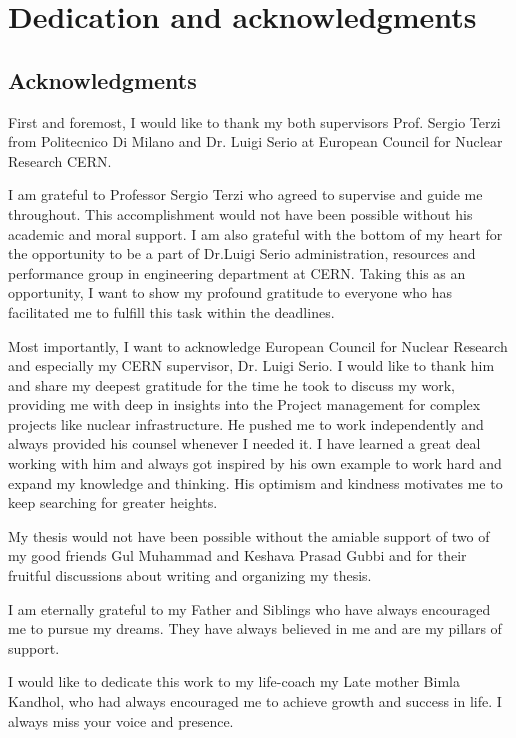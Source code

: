 %
%

\chapter*{Dedication and acknowledgments}
\begin{SingleSpace}
\section*{Acknowledgments}
First and foremost, I would like to thank my both supervisors Prof. Sergio Terzi from Politecnico Di Milano and Dr. Luigi Serio at European Council for Nuclear Research CERN. 

I am grateful to Professor Sergio Terzi who agreed to supervise and guide me throughout. This accomplishment would not have been possible without his academic and moral support. I am also grateful with the bottom of my heart for the opportunity to be a part of Dr.Luigi Serio administration, resources and performance group in engineering department at CERN. Taking this as an opportunity, I want to show my profound gratitude to everyone who has facilitated me to fulfill this task within the deadlines. 

Most importantly, I want to acknowledge European Council for Nuclear Research and especially my CERN supervisor, Dr. Luigi Serio.  I would like to thank him and share my deepest gratitude for the time he took to discuss my work, providing me with deep in insights into the Project management for complex projects like nuclear infrastructure. He pushed me to work independently and always provided his counsel whenever I needed it. I have learned a great deal working with him and always got inspired by his own example to work hard and expand my knowledge and thinking. His optimism and kindness motivates me to keep searching for greater heights.

My thesis would not have been possible without the amiable support of two of my good friends Gul Muhammad and Keshava Prasad Gubbi and for their fruitful discussions about writing and organizing my thesis. 

I am eternally grateful to my Father and Siblings who have always encouraged me to pursue my dreams. They have always believed in me and are my pillars of support.

I would like to dedicate this work to my life-coach my Late mother Bimla Kandhol, who had always encouraged me to achieve growth and success in life. I always miss your voice and presence. 

\end{SingleSpace}
\clearpage
